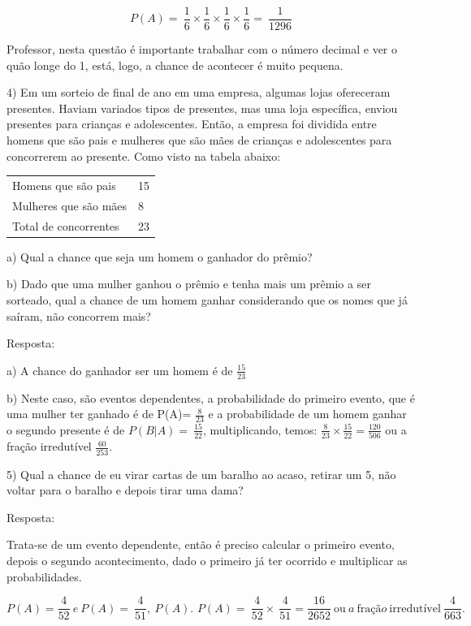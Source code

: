 \[P(A) = \ \frac{1}{6} \times \frac{1}{6} \times \frac{1}{6} \times \frac{1}{6} = \ \frac{1}{1296}\]

Professor, nesta questão é importante trabalhar com o número decimal e
ver o quão longe do 1, está, logo, a chance de acontecer é muito
pequena.

4) Em um sorteio de final de ano em uma empresa, algumas lojas
ofereceram presentes. Haviam variados tipos de presentes, mas uma loja
específica, enviou presentes para crianças e adolescentes. Então, a
empresa foi dividida entre homens que são pais e mulheres que são mães
de crianças e adolescentes para concorrerem ao presente. Como visto na
tabela abaixo:

\begin{longtable}[]{@{}ll@{}}
\toprule
\endhead
Homens que são pais & 15\tabularnewline
Mulheres que são mães & 8\tabularnewline
Total de concorrentes & 23\tabularnewline
\bottomrule
\end{longtable}

a) Qual a chance que seja um homem o ganhador do prêmio?

b) Dado que uma mulher ganhou o prêmio e tenha mais um prêmio a ser
sorteado, qual a chance de um homem ganhar considerando que os nomes que
já saíram, não concorrem mais?

Resposta:

a) A chance do ganhador ser um homem é de \(\frac{15}{23}\)

b) Neste caso, são eventos dependentes, a probabilidade do primeiro
evento, que é uma mulher ter ganhado é de P(A)= \(\frac{8}{23}\) e a
probabilidade de um homem ganhar o segundo presente é de
\(P(B|A) = \ \frac{15}{22}\), multiplicando, temos:
\(\frac{8}{23} \times \frac{15}{22} = \frac{120}{506}\) ou a fração
irredutível \(\frac{60}{253}.\)

5) Qual a chance de eu virar cartas de um baralho ao acaso, retirar um
5, não voltar para o baralho e depois tirar uma dama?

Resposta:

Trata-se de um evento dependente, então é preciso calcular o primeiro
evento, depois o segundo acontecimento, dado o primeiro já ter ocorrido
e multiplicar as probabilidades.

\[P\left( A \right) = \frac{4}{52}\ e\ P\left( A \right) = \ \frac{4}{51},\ P\left( A \right)\text{.\ }P\left( A \right) = \ \frac{4}{52} \times \ \frac{4}{51} = \frac{16}{2652}\ \text{ou}\ a\ \text{fra}ção\ \text{irredut}í\text{vel}\ \frac{4}{663}.\]

